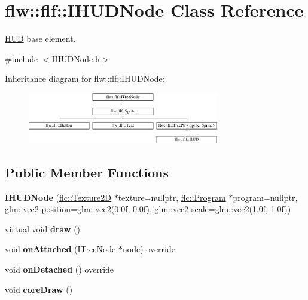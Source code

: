 \hypertarget{classflw_1_1flf_1_1Sprite}{}\section{flw\+:\+:flf\+:\+:I\+H\+U\+D\+Node Class Reference}
\label{classflw_1_1flf_1_1Sprite}


\hyperlink{classflw_1_1flf_1_1HUD}{H\+UD} base element.  




{\ttfamily \#include $<$I\+H\+U\+D\+Node.\+h$>$}

Inheritance diagram for flw\+:\+:flf\+:\+:I\+H\+U\+D\+Node\+:\begin{figure}[H]
\begin{center}
\leavevmode
\includegraphics[height=2.222222cm]{classflw_1_1flf_1_1Sprite}
\end{center}
\end{figure}
\subsection*{Public Member Functions}
\begin{DoxyCompactItemize}
\item 
{\bfseries I\+H\+U\+D\+Node} (\hyperlink{classflw_1_1flc_1_1Texture2D}{flc\+::\+Texture2D} $\ast$texture=nullptr, \hyperlink{classflw_1_1flc_1_1Program}{flc\+::\+Program} $\ast$program=nullptr, glm\+::vec2 position=glm\+::vec2(0.\+0f, 0.\+0f), glm\+::vec2 scale=glm\+::vec2(1.\+0f, 1.\+0f))\hypertarget{classflw_1_1flf_1_1Sprite_a79410c95515a7f67e329f188a75eb2f1}{}\label{classflw_1_1flf_1_1Sprite_a79410c95515a7f67e329f188a75eb2f1}

\item 
virtual void {\bfseries draw} ()\hypertarget{classflw_1_1flf_1_1Sprite_a3b7f521fed9747d56cf8d7ee626c8c28}{}\label{classflw_1_1flf_1_1Sprite_a3b7f521fed9747d56cf8d7ee626c8c28}

\item 
void {\bfseries on\+Attached} (\hyperlink{classflw_1_1flf_1_1ITreeNode}{I\+Tree\+Node} $\ast$node) override\hypertarget{classflw_1_1flf_1_1Sprite_a36e5be05557f6daa4a7ef199fd1918e5}{}\label{classflw_1_1flf_1_1Sprite_a36e5be05557f6daa4a7ef199fd1918e5}

\item 
void {\bfseries on\+Detached} () override\hypertarget{classflw_1_1flf_1_1Sprite_a6979b712b6ef43ebffaf3419a670237f}{}\label{classflw_1_1flf_1_1Sprite_a6979b712b6ef43ebffaf3419a670237f}

\item 
void {\bfseries core\+Draw} ()\hypertarget{classflw_1_1flf_1_1Sprite_a744f438eb975e52fb88e28a12efc8411}{}\label{classflw_1_1flf_1_1Sprite_a744f438eb975e52fb88e28a12efc8411}

\end{DoxyCompactItemize}
